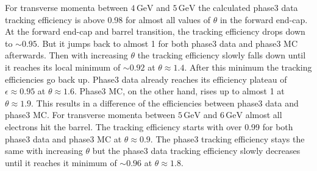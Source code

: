 \documentclass[a4paper,11pt,twosided,final,german,openbib,pdftex,listof=totoc,bibliography=totoc]{scrbook}
\begin{document}
For transverse momenta between $4\,\textrm{GeV}$ and $5\,\textrm{GeV}$ the calculated phase3 data tracking efficiency is above 0.98 for almost all values of $\theta$ in the forward end-cap. At the forward end-cap and barrel transition, the tracking efficiency drops down to $\sim 0.95$. But it jumps back to almost 1 for both phase3 data and phase3 MC afterwards. Then with increasing $\theta$ the tracking efficiency slowly falls down until it reaches its local minimum of $\sim 0.92$ at $\theta \approx 1.4$. After this minimum the tracking efficiencies go back up. Phase3 data already reaches its efficiency plateau of $\epsilon \approx 0.95 $ at $\theta \approx 1.6$. Phase3 MC, on the other hand, rises up to  almost 1 at $\theta \approx 1.9$. This results in a difference of the efficiencies between phase3 data and phase3 MC.
For transverse momenta between $5\,\textrm{GeV}$ and $6\,\textrm{GeV}$ almost all electrons hit the barrel. The tracking efficiency starts with over 0.99 for both phase3 data and phase3 MC at $\theta \approx 0.9$. The phase3 tracking efficiency stays the same with increasing $\theta$ but the phase3 data tracking efficiency slowly decreases until it reaches it minimum of $\sim 0.96$ at $\theta \approx 1.8$.
\end{document}
